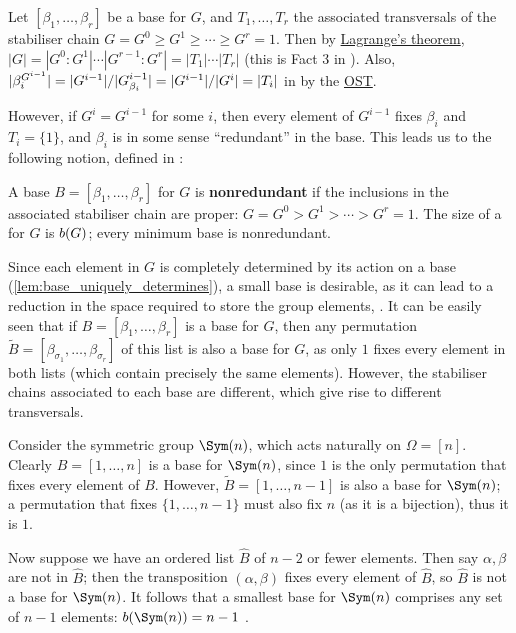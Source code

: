 \begin{proposition}\label{prop:stabiliser_chain_indexes}
    Let $[\beta_1,\dotsc,\beta_r]$ be a base for $G$, and $T_1,\dotsc,T_r$ the associated transversals of the stabiliser chain $G = G^0 \geq G^1 \geq \dotsb \geq G^r = 1$. Then by \hyperref[thm:lagrange]{Lagrange's theorem}, $|G| = |G^0 : G^1| \dotsb |G^{r-1} : G^r| = |T_1| \dotsb |T_r|$ (this is Fact 3 in \cite{blaha1992}). Also, $|\beta_i^{G^{i-1}}| = |G^{i-1}|/|\added{2}{G^{i-1}_{\beta_i}}| = |G^{i-1}|/|G^i| = |T_i|$ in  by the \hyperref[thm:orbit_stabiliser]{OST}. \qedhere
\end{proposition}

However, if $G^i = G^{i-1}$ for some $i$, then every element of $G^{i-1}$ fixes $\beta_i$ and $T_i = \{1\}$, and $\beta_i$ is in some sense ``redundant'' in the base.  This leads us to the following notion, defined in \cite{blaha1992}:

\begin{definition}\label{def:nonredundant_base}
    A base $B = [\beta_1,\dotsc,\beta_r]$ for $G$ is \textbf{nonredundant} if the inclusions in the associated stabiliser chain are proper: $G = G^0 > G^1 > \dotsb > G^r = 1$. The size of a  for $G$ is $\added{2}{b(G)}$; every minimum base is nonredundant.
\end{definition}

Since each element in $G$ is completely determined by its action on a base (\autoref{lem:base_uniquely_determines}), a small base is desirable, as it can lead to a reduction in the space required to store the group elements,  \cite{blaha1992}. It can be easily seen that if $B = [\beta_1,\dotsc,\beta_r]$ is a base for $G$, then any permutation $\tilde B = [\beta_{\sigma_1},\dotsc,\beta_{\sigma_r}]$ of this list is also a base for $G$, as only $1$ fixes every element in both lists (which contain precisely the same elements). However, the stabiliser chains associated to each base are different, which give rise to different transversals.

\begin{example}\label{eg:symmetric_group_base}
    Consider the symmetric group $\Sym(n)$, which acts naturally on $\Omega = [n]$. Clearly $B = [1,\dotsc,n]$ is a base for $\Sym(n)$, since $1$ is the only permutation that fixes every element of $B$. However, $\tilde B = [1,\dotsc,n - 1]$ is also a base for $\Sym(n)$; a permutation that fixes $\{1,\dotsc,n - 1\}$ must also fix $n$ (as it is a bijection), thus it is  $1$.

    Now suppose we have an ordered list $\hat B$ of $n - 2$ or fewer elements. Then say $\alpha,\beta$ are not in $\hat B$; then the transposition $(\alpha,\beta)$ fixes every element of $\hat B$, so $\hat B$ is not a base for $\Sym(n)$. It follows that a smallest base for $\Sym(n)$ comprises any set of $n - 1$ elements: $\added{2}{b}(\Sym(n)) = n - 1$ .
\end{example}

